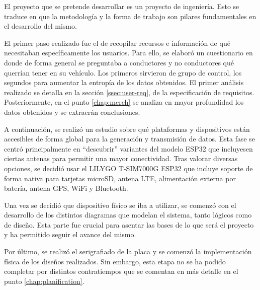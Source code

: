 El proyecto que se pretende desarrollar es un proyecto de ingeniería. Esto se
traduce en que la metodología y la forma de trabajo son pilares fundamentales
en el desarrollo del mismo.

El primer paso realizado fue el de recopilar recursos e información de qué
necesitaban específicamente los usuarios. Para ello, se elaboró un cuestionario
en donde de forma general se preguntaba a conductores y no conductores qué querrían
tener en su vehículo. Los primeros sirvieron de grupo de control, los segundos para
aumentar la entropía de los datos obtenidos. El primer análisis realizado se detalla
en la sección \ref{ssec:user-req}, de la especificación de requisitos. Posteriormente,
en el punto \ref{chap:merch} se analiza en mayor profundidad los datos obtenidos
y se extraerán conclusiones.

A continuación, se realizó un estudio sobre qué plataformas y dispositivos están
accesibles de forma global para la generación y transmisión de datos. Esta fase
se centró principalmente en ``descubrir'' variantes del modelo ESP32 que incluyesen
ciertas antenas para permitir una mayor conectividad. Tras valorar diversas opciones,
se decidió usar el LILYGO T-SIM7000G ESP32 que incluye soporte de forma nativa para
tarjetas microSD, antena \ac{LTE}, alimentación externa por batería, antena \ac{GPS}, WiFi y
Bluetooth.

Una vez se decidió que dispositivo físico se iba a utilizar, se comenzó con el desarrollo
de los distintos diagramas que modelan el sistema, tanto lógicos como de diseño. Esta
parte fue crucial para asentar las bases de lo que será el proyecto y ha permitido seguir
el avance del mismo.

Por último, se realizó el serigrafiado de la placa y se comenzó la implementación
física de los diseños realizados. Sin embargo, esta etapa no se ha podido completar
por distintos contratiempos que se comentan en más detalle en el punto \ref{chap:planification}.
